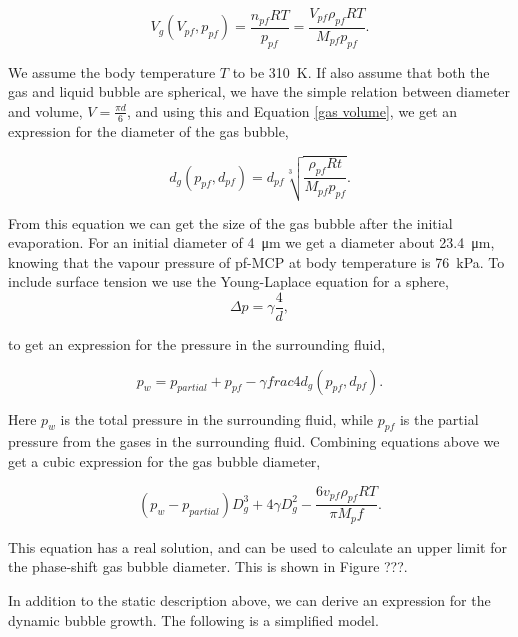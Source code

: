 \begin{equation}
\label{gas volume}
V_g(V_{pf}, p_{pf}) = \frac{n_{pf}RT}{p_{pf}}=\frac{V_{pf}\rho_{pf}RT}{M_{pf}p_{pf}}.
\end{equation}

We assume the body temperature $T$ to be \SI{310}{\kelvin}. If also assume that both the gas and liquid bubble are spherical, we have the simple relation between diameter and volume, $V = \frac{\pi d}{6}$, and using this and Equation \eqref{gas volume}, we get an expression for the diameter of the gas bubble, 

\begin{equation}
\label{diameter}
d_g(p_{pf}, d_{pf}) = d_{pf}\sqrt[3]{\frac{\rho_{pf}Rt}{M_{pf}p_{pf}}}.
\end{equation}

From this equation we can get the size of the gas bubble after the initial evaporation. For an initial diameter of \SI{4}{\micro\metre} we get a diameter about \SI{23.4}{\micro\metre}, knowing that the vapour pressure of pf-MCP at body temperature is \SI{76}{\kilo\pascal}\cite{Healey2013}.
To include surface tension we use the Young-Laplace equation for a sphere,
\begin{equation}
\label{Young-Laplace}
\Delta p = \gamma\frac{4}{d},
\end{equation}

to get an expression for the pressure in the surrounding fluid, 

\begin{equation}
p_w = p_{partial} + p_{pf} - \gamma frac{4}{d_g(p_{pf}\mathrm{, } d_{pf})}.
\end{equation}

Here $p_w$ is the total pressure in the surrounding fluid, while $p_{pf}$ is the partial pressure from the gases in the surrounding fluid. Combining equations above we get a cubic expression for the gas bubble diameter,  

\begin{equation}
\label{cubic}
(p_w-p_{partial})D_g^3 + 4\gamma D_g^2 - \frac{6v_{pf}\rho_{pf}RT}{\pi M_pf}.
\end{equation}

This equation has a real solution, and can be used to calculate an upper limit for the phase-shift gas bubble diameter. This is shown in Figure ???.

In addition to the static description above, we can derive an expression for the dynamic bubble growth. The following is a simplified model.

